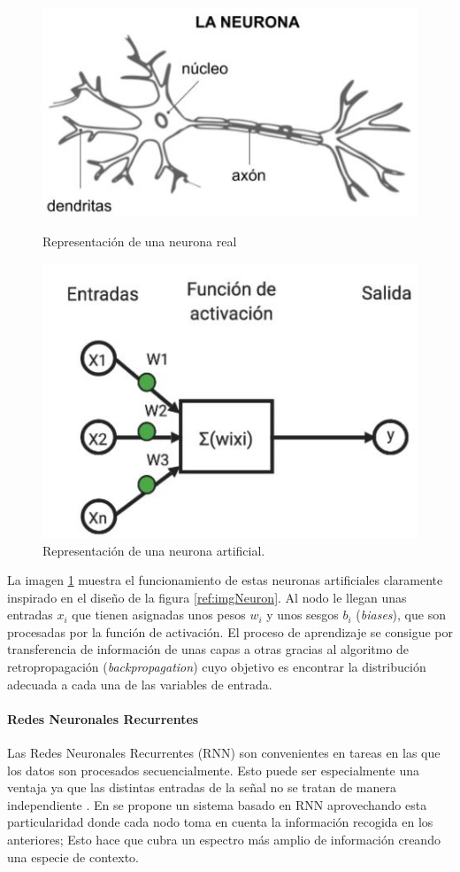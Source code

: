 \documentclass[11pt,a4paper,spanish]{book}
\begin{document}
	
	\begin{figure}[!htb]
		\begin{minipage}{0.48\textwidth}
			\centering
			\includegraphics[width=.8\textwidth]{neurona.JPG}
			\caption{Representación de una neurona real}
			\label{ref:imgNeuron}
		\end{minipage}\hfill
		\begin{minipage}{0.48\textwidth}
			\centering
			\includegraphics[width=.6\textwidth]{neuronaArtificial.JPG}\hfill
			\caption{Representación de una neurona artificial.}
			\label{ref:imgArtNeuron}
		\end{minipage}
	\end{figure}

	La imagen \ref{ref:imgArtNeuron} muestra el funcionamiento de estas neuronas artificiales claramente inspirado en el diseño de la figura \ref{ref:imgNeuron}. Al nodo le llegan unas entradas $x_i$ que tienen asignadas unos pesos $w_i$ y unos sesgos $b_i$ (\emph{biases}), que son procesadas por la función de activación. El proceso de aprendizaje se consigue por transferencia de información de unas capas a otras gracias al algoritmo de retropropagación (\emph{backpropagation}) cuyo objetivo es encontrar la distribución adecuada a cada una de las variables de entrada.

	
	\paragraph{Redes Neuronales Recurrentes}\hfill \break
	Las Redes Neuronales Recurrentes (RNN) son convenientes en tareas en las que los datos son procesados secuencialmente. Esto puede ser especialmente una ventaja ya que las distintas entradas de la señal no se tratan de manera independiente \cite{Lim2017}. En \cite{Lee2015} se propone un sistema basado en RNN aprovechando esta particularidad donde cada nodo toma en cuenta la información recogida en los anteriores; Esto hace que cubra un espectro más amplio de información creando una especie de contexto.
	
\end{document}
